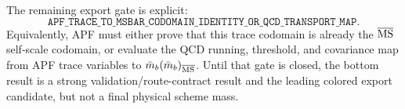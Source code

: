 The remaining export gate is explicit:
\begin{equation}
\boxed{
  \texttt{APF\_TRACE\_TO\_MSBAR\_CODOMAIN\_IDENTITY\_OR\_QCD\_TRANSPORT\_MAP}.
}
\end{equation}
Equivalently, APF must either prove that this trace codomain is already the
\(\overline{\rm MS}\) self-scale codomain, or evaluate the QCD running,
threshold, and covariance map from APF trace variables to
\(\bar m_b(\bar m_b)_{\overline{\rm MS}}\).  Until that gate is closed, the bottom
result is a strong validation/route-contract result and the leading colored
export candidate, but not a final physical scheme mass.
